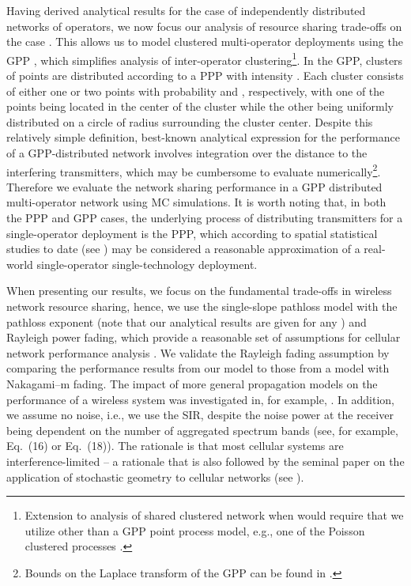 \documentclass[12pt, journal,doublecolumn, final]{IEEEtran}
\begin{document}
Having derived analytical results for the case of independently distributed networks of  operators, we now focus our analysis of resource sharing trade-offs on the case . This allows us to model clustered multi-operator deployments using the \ac{GPP} \cite{Haenggi_2013}, which simplifies analysis of inter-operator clustering\footnote{Extension to analysis of shared clustered network when  would require that we utilize other than a \ac{GPP} point process model, e.g., one of the Poisson clustered processes \cite{Haenggi_2013}.}. In the \ac{GPP}, clusters of points are distributed according to a \ac{PPP} with intensity . Each cluster consists of either one or two points with probability  and , respectively, with one of the points being located in the center of the cluster while the other being uniformly distributed on a circle of radius  surrounding the cluster center. Despite this relatively simple definition, best-known analytical expression for the performance of a \ac{GPP}-distributed network involves integration over the distance to the interfering transmitters, which may be cumbersome to evaluate numerically\footnote{Bounds on the Laplace transform of the \ac{GPP} can be found in \cite{GuoZhongHaenggiZhang_2014}.}. Therefore we evaluate the network sharing performance in a \ac{GPP} distributed multi-operator network using \ac{MC} simulations. It is worth noting that, in both the \ac{PPP} and \ac{GPP} cases, the underlying process of distributing transmitters for a single-operator deployment is the \ac{PPP}, which according to spatial statistical studies to date (see \cite{GuoHaenggi_2013,KibildaGalkinDaSilva_2015}) may be considered a reasonable approximation of a real-world single-operator single-technology deployment.

When presenting our results, we focus on the fundamental trade-offs in wireless network resource sharing, hence, we use the single-slope pathloss model with the pathloss exponent  (note that our analytical results are given for any ) and Rayleigh power fading, which provide a reasonable set of assumptions for cellular network performance analysis \cite{AndrewsGuptaDhillon_2016}. We validate the Rayleigh fading assumption by comparing the performance results from our model to those from a model with Nakagami--m fading. The impact of more general propagation models on the performance of a wireless system was investigated in, for example, \cite{DiRenzoGuidottiCorazza_2013,GaliottoEtAl_2014}. In addition, we assume no noise, i.e., we use the \ac{SIR}, despite the noise power at the receiver being dependent on the number of aggregated spectrum bands (see, for example, Eq.~(16) or Eq.~(18)). The rationale is that most cellular systems are interference-limited -- a rationale that is also followed by the seminal paper on the application of stochastic geometry to cellular networks (see \cite{AndrewsBaccelliGanti_2011}).
\end{document}
